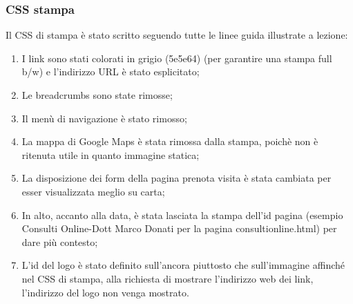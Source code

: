 \subsubsection{CSS stampa}
Il CSS  di stampa è stato scritto seguendo tutte le linee guida illustrate a lezione:
\begin{enumerate}
\item I link sono stati colorati in grigio (5e5e64) (per garantire una stampa full b/w) e l’indirizzo URL è stato esplicitato;
\item Le breadcrumbs sono state rimosse;
\item Il menù di navigazione è stato rimosso;
\item La mappa di Google Maps è stata rimossa dalla stampa, poichè non è ritenuta utile in quanto immagine statica;
\item La disposizione dei form della pagina prenota visita è stata cambiata per esser visualizzata meglio su carta;
\item In alto, accanto alla data, è stata lasciata la stampa dell’id pagina (esempio Consulti Online-Dott Marco Donati per la pagina consultionline.html) per dare più contesto;
\item L'id del logo è stato definito sull'ancora piuttosto che sull'immagine affinché nel CSS di stampa, alla richiesta di mostrare l’indirizzo web dei link, l’indirizzo del logo non venga mostrato.
\end{enumerate}

